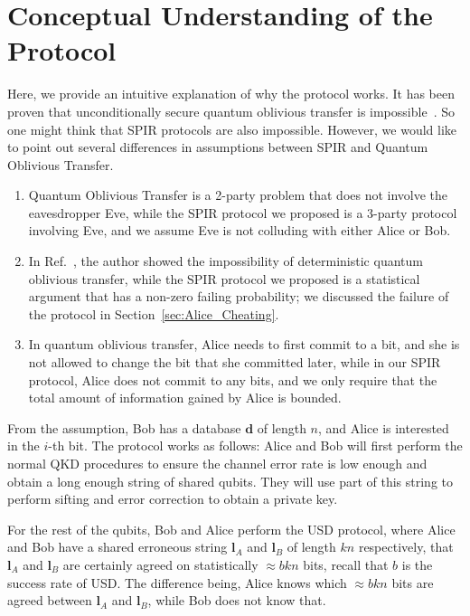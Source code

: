 \documentclass[%
 reprint,
superscriptaddress,
 amsmath,amssymb,
 aps,
]{revtex4-2}
\begin{document}
\section{Conceptual Understanding of the Protocol}

Here, we provide an intuitive explanation of why the protocol works. It has been proven that unconditionally secure quantum oblivious transfer is impossible~\cite{Insecurity_Quantum_Oblivious_transfer1}. So one might think that SPIR protocols are also impossible. However, we would like to point out several differences in assumptions between SPIR and Quantum Oblivious Transfer.

\begin{enumerate}
    \item Quantum Oblivious Transfer is a 2-party problem that does not involve the eavesdropper Eve, while the SPIR protocol we proposed is a 3-party protocol involving Eve, and we assume Eve is not colluding with either Alice or Bob.

    \item In Ref.~\cite{Insecurity_Quantum_Oblivious_transfer1}, the author showed the impossibility of deterministic quantum oblivious transfer, while the SPIR protocol we proposed is a statistical argument that has a non-zero failing probability; we discussed the failure of the protocol in Section~\ref{sec:Alice_Cheating}.

    \item In quantum oblivious transfer, Alice needs to first commit to a bit, and she is not allowed to change the bit that she committed later, while in our SPIR protocol, Alice does not commit to any bits, and we only require that the total amount of information gained by Alice is bounded.
\end{enumerate}

From the assumption, Bob has a database $\mathbf{d}$ of length $n$, and Alice is interested in the $i$-th bit. The protocol works as follows: Alice and Bob will first perform the normal QKD procedures to ensure the channel error rate is low enough and obtain a long enough string of shared qubits. They will use part of this string to perform sifting and error correction to obtain a private key.

For the rest of the qubits, Bob and Alice perform the USD protocol, where Alice and Bob have a shared erroneous string $\mathbf{l}_A$ and $\mathbf{l}_B$ of length $kn$ respectively, that $\mathbf{l}_A$ and $\mathbf{l}_B$ are certainly agreed on statistically $\approx bkn$ bits, recall that $b$ is the success rate of USD. The difference being, Alice knows which $\approx bkn$ bits are agreed between $\mathbf{l}_A$ and $\mathbf{l}_B$, while Bob does not know that.
\end{document}

